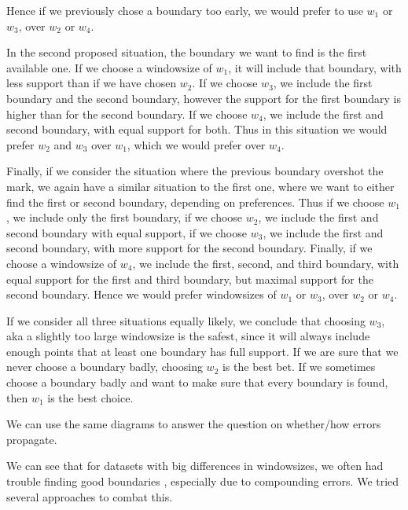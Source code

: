Hence if we previously chose a boundary too early, we would prefer to use $w_1$ or $w_3$, over $w_2$ or $w_4$.

In the second proposed situation, the boundary we want to find is the first available one. If we choose a windowsize of $w_1$, it will include that boundary, with less support than if we have chosen $w_2$. If we choose $w_3$, we include the first boundary and the second boundary, however the support for the first boundary is higher than for the second boundary. If we choose $w_4$, we include the first and second boundary, with equal support for both. Thus in this situation we would prefer $w_2$ and $w_3$ over $w_1$, which we would prefer over $w_4$.

Finally, if we consider the situation where the previous boundary overshot the mark, we again have a similar situation to the first one, where we want to either find the first or second boundary, depending on preferences. Thus if we choose $w_1$, we include only the first boundary, if we choose $w_2$, we include the first and second boundary with equal support, if we choose $w_3$, we include the first and second boundary, with more support for the second boundary. Finally, if we choose a windowsize of $w_4$, we include the first, second, and third boundary, with equal support for the first and third boundary, but maximal support for the second boundary. Hence we would prefer windowsizes of $w_1$ or $w_3$, over $w_2$ or $w_4$.

If we consider all three situations equally likely, we conclude that choosing $w_3$, aka a slightly too large windowsize is the safest, since it will always include enough points that at least one boundary has full support. If we are sure that we never choose a boundary badly, choosing $w_2$ is the best bet. If we sometimes choose a boundary badly and want to make sure that every boundary is found, then $w_1$ is the best choice.


We can use the same diagrams to answer the question on whether/how errors propagate. 


We can see that for datasets with big differences in windowsizes, we often had trouble finding good boundaries , especially due to compounding errors. We tried several approaches to combat this.

